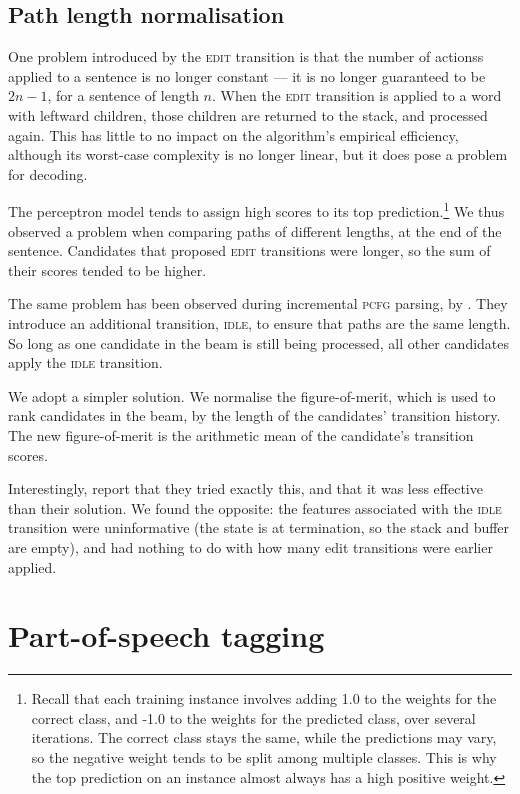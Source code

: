 \documentclass[11pt,letterpaper]{article}
\begin{document}
\subsection{Path length normalisation}

One problem introduced by the \textsc{edit} transition is that the number of
actionss applied to a sentence is no longer constant --- it is no longer guaranteed
to be $2n-1$, for a sentence of length $n$. When the \textsc{edit} transition is
applied to a word with leftward children, those children are returned to the stack,
and processed again.  This has little to no impact on the algorithm's empirical
efficiency, although its worst-case complexity is no longer linear, but it does
pose a problem for decoding.

The perceptron model tends to assign
high scores to its top prediction.\footnote{Recall that each training instance
involves adding 1.0 to the weights for the correct class, and -1.0 to the weights
for the predicted class, over several iterations. The correct class stays the
same, while the predictions may vary, so the negative weight tends to be split
among multiple classes. This is why the top prediction on an instance almost
always has a high positive weight.}
We thus observed a problem when comparing paths of different lengths, at the end
of the sentence. Candidates that proposed \textsc{edit} transitions were longer,
so the sum of their scores tended to be higher.

The same problem has been observed during incremental \textsc{pcfg} parsing,
by \citet{zhang:13}.  They introduce an additional transition, \textsc{idle},
to ensure that paths are the same length. So long as one candidate in the beam
is still being processed, all other candidates apply the \textsc{idle} transition.

We adopt a simpler solution.  We normalise the figure-of-merit, which is used to rank
candidates in the beam, by the length of the candidates' transition history. The
new figure-of-merit is the
arithmetic mean of the candidate's transition scores.

Interestingly, \citet{zhang:13} report that they tried exactly this, and that it
was less effective than their solution. We found the opposite: the features
associated with the \textsc{idle} transition were uninformative (the state is at
termination, so the stack and buffer are empty), and had nothing to do with how
many edit transitions were earlier applied.

\section{Part-of-speech tagging}
\end{document}
